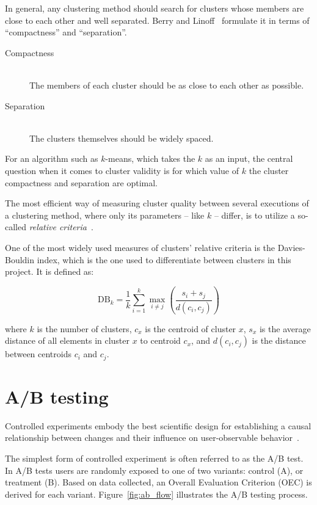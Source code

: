 In general, any clustering method should search for clusters whose members are close to each other and well separated. Berry and Linoff~\cite{Berry1996} formulate it in terms of ``compactness'' and ``separation''.

\begin{description}
  \item[Compactness] \hfill \\
    The members of each cluster should be as close to each other as possible.
  \item[Separation] \hfill \\
    The clusters themselves should be widely spaced.
\end{description}

For an algorithm such as $k$-means, which takes the $k$ as an input, the central question when it comes to cluster validity is for which value of $k$ the cluster compactness and separation are optimal.

The most efficient way of measuring cluster quality between several executions of a clustering method, where only its parameters -- like $k$ -- differ, is to utilize a so-called \emph{relative criteria}~\cite{Halkidi2001}.

One of the most widely used measures of clusters' relative criteria is the Davies-Bouldin index, which is the one used to differentiate between clusters in this project. It is defined as:

\begin{equation}
  \text{DB}_k = \frac{1}{k} \sum_{i=1}^k \max_{i \neq j} \left( \frac{s_i + s_j}{d(c_i, c_j)} \right)
\end{equation}

where $k$ is the number of clusters, $c_x$ is the centroid of cluster $x$, $s_x$ is the average distance of all elements in cluster $x$ to centroid $c_x$, and $d(c_i,c_j)$ is the distance between centroids $c_i$ and $c_j$.

\section{A/B testing}
\label{survey:sec:ab_testing}

Controlled experiments embody the best scientific design for establishing a causal relationship between changes and their influence on user-observable behavior~\cite{Kohavi2007,Kohavi2008}.

The simplest form of controlled experiment is often referred to as the A/B test. In A/B tests users are randomly exposed to one of two variants: control (A), or treatment (B). Based on data collected, an Overall Evaluation Criterion (OEC) is derived for each variant. Figure~\ref{fig:ab_flow} illustrates the A/B testing process.

